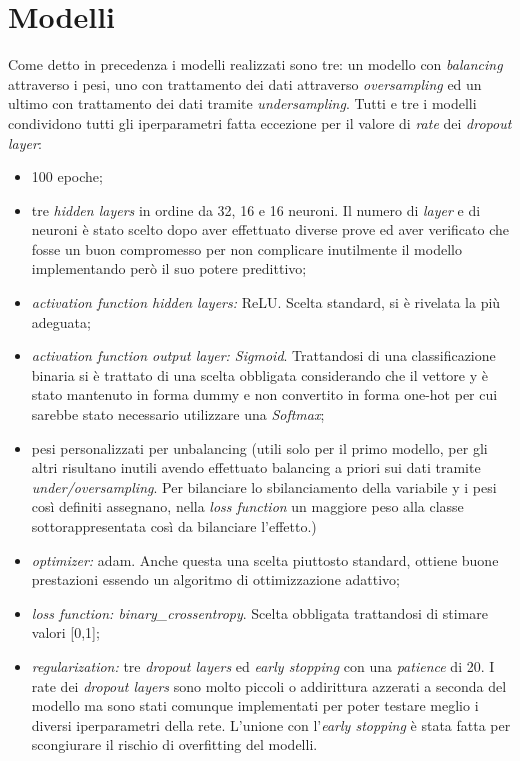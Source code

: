 \documentclass{article}
\begin{document}
\section{Modelli}
Come detto in precedenza i modelli realizzati sono tre: un modello con \textit{balancing} attraverso i pesi, uno con trattamento dei dati attraverso \textit{oversampling} ed un ultimo con trattamento dei dati tramite \textit{undersampling}.
Tutti e tre i modelli condividono tutti gli iperparametri fatta eccezione per il valore di \textit{rate} dei \textit{dropout layer}:
\begin{itemize}[noitemsep]
\item 100 epoche;
\item tre \textit{hidden layers} in ordine da 32, 16 e 16 neuroni. 
Il numero di \textit{layer} e di neuroni è stato scelto dopo aver effettuato diverse prove ed aver verificato che fosse un buon compromesso per non complicare inutilmente il modello implementando però il suo potere predittivo;
\item \textit{activation function hidden layers: }ReLU. 
Scelta standard, si è rivelata la più adeguata;
\item \textit{activation function output layer: Sigmoid}. 
Trattandosi di una classificazione binaria si è trattato di una scelta obbligata considerando che il vettore y è stato mantenuto in forma dummy e non convertito in forma one-hot per cui sarebbe stato necessario utilizzare una \textit{Softmax};
\item pesi personalizzati per unbalancing (utili solo per il primo modello, per gli altri risultano inutili avendo effettuato balancing a priori sui dati tramite \textit{under/oversampling}. 
Per bilanciare lo sbilanciamento della variabile y i pesi così definiti assegnano, nella \textit{loss function} un maggiore peso alla classe sottorappresentata così da bilanciare l'effetto.)
\item \textit{optimizer: }adam. 
Anche questa una scelta piuttosto standard, ottiene buone prestazioni essendo un algoritmo di ottimizzazione adattivo;
\item \textit{loss function: binary\_crossentropy}.
Scelta obbligata trattandosi di stimare valori [0,1];
\item \textit{regularization: }tre \textit{dropout layers} ed \textit{early stopping} con una \textit{patience} di 20.
I rate dei \textit{dropout layers} sono molto piccoli o addirittura azzerati a seconda del modello ma sono stati comunque implementati per poter testare meglio i diversi iperparametri della rete. 
L'unione con l'\textit{early stopping} è stata fatta per scongiurare il rischio di overfitting del modelli.
\end{itemize}
\end{document}
